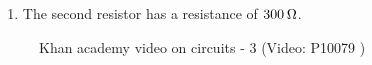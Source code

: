 {\begin{mdframed}[linewidth=4, leftmargin=40, rightmargin=40]
\begin{exercise}
\begin{enumerate}[noitemsep, label=\textbf{Step} \textbf{\arabic*}. ]
    \begin{equation}
    \begin{array}{ccc}\hfill \frac{1}{{R}_{p}}& =& \frac{1}{{R}_{1}}+\frac{1}{{R}_{2}}\hfill \\ \hfill \therefore \frac{1}{{R}_{2}}& =& \frac{1}{{R}_{p}}-\frac{1}{{R}_{1}}\hfill \\ & =& \frac{1}{100\phantom{\rule{0.166667em}{0ex}}\Omega }-\frac{1}{150\phantom{\rule{0.166667em}{0ex}}\Omega }\hfill \\ & =& \frac{3-2}{300}\hfill \\ & =& \frac{1}{300}\hfill \\ \hfill {R}_{2}& =& 300\phantom{\rule{0.166667em}{0ex}}\Omega \hfill \end{array}\tag{16.43}
      \end{equation}
          \item  
          \label{m38776*id6537341}The second resistor has a resistance of $300\phantom{\rule{2pt}{0ex}}\Omega $. \par 
          \end{enumerate}
    \end{exercise}
    \end{mdframed}
    }
    \noindent
    \setcounter{subfigure}{0}
	\begin{figure}[H] %
    \textnormal{Khan academy video on circuits - 3}\vspace{.1in} \nopagebreak
  \label{m38776*yt-media3}\label{m38776*yt-video3}
             { (Video:  P10079 )}
      \vspace{2pt}
    \vspace{.1in}
 \end{figure}       
\label{m38776*secfhsst!!!underscore!!!id1795}
